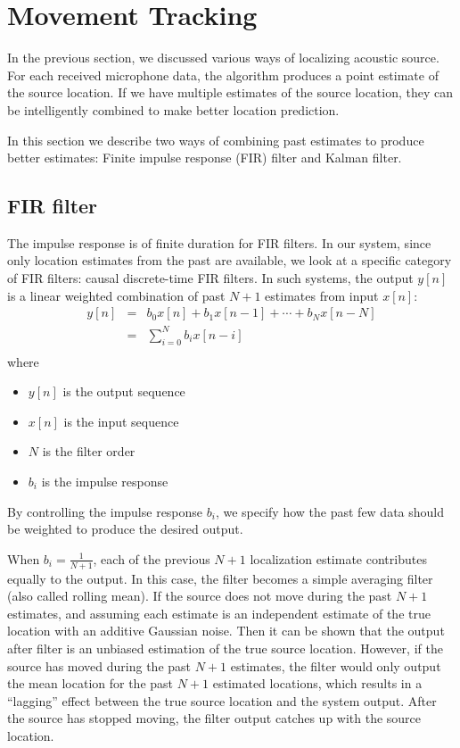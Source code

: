 \section{Movement Tracking}
In the previous section, we discussed various ways of localizing acoustic source. For each received microphone data, the algorithm produces a point estimate of the source location. If we have multiple estimates of the source location, they can be intelligently combined to make better location prediction. 

In this section we describe two ways of combining past estimates to produce better estimates: Finite impulse response (FIR) filter and Kalman filter.

\subsection{FIR filter}
The impulse response is of finite duration for FIR filters. In our system, since only location estimates from the past are available, we look at a specific category of FIR filters: causal discrete-time FIR filters. In such systems, the output $y[n]$ is a linear weighted combination of past $N+1$ estimates from input $x[n]$:
\begin{eqnarray}
y[n] & = & b_0x[n] + b_1x[n-1] + \cdots + b_Nx[n-N]\\
& = & \sum_{i=0}^N b_i x[n-i]\\
\end{eqnarray}
where
\begin{itemize}
\item $y[n]$ is the output sequence
\item $x[n]$ is the input sequence
\item $N$ is the filter order
\item $b_i$ is the impulse response
\end{itemize}

By controlling the impulse response $b_i$, we specify how the past few data should be weighted to produce the desired output. 

When $b_i=\frac{1}{N+1}$, each of the previous $N+1$ localization estimate contributes equally to the output. In this case, the filter becomes a simple averaging filter (also called rolling mean). If the source does not move during the past $N+1$ estimates, and assuming each estimate is an independent estimate of the true location with an additive Gaussian noise. Then it can be shown that the output after filter is an unbiased estimation of the true source location. However, if the source has moved during the past $N+1$ estimates, the filter would only output the mean location for the past $N+1$ estimated locations, which results in a ``lagging'' effect between the true source location and the system output. After the source has stopped moving, the filter output catches up with the source location. 


